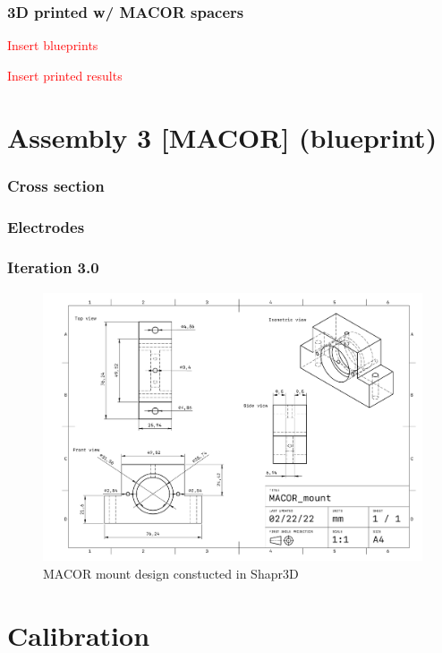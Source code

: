 \subsubsection{3D printed w/ MACOR spacers}

\textcolor{red}{Insert blueprints}

\textcolor{red}{Insert printed results}

\newpage

\section{Assembly 3 [MACOR] (blueprint)}
\subsubsection{Cross section}
\subsubsection{Electrodes}

\subsubsection{Iteration 3.0}
\begin{figure}[H]
\includegraphics[width=\textwidth]{figs/ALGAAS/assemblies/assembly3/MACOR_mount.pdf}
\caption{MACOR mount design constucted in Shapr3D}
\label{fig:macormountdesign}
\end{figure}

\mbox{}
\vfill

\section{Calibration}\label{sec:calibration}
%

